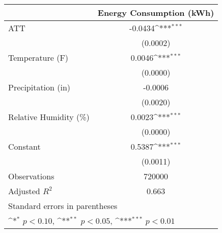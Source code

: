 {
\def\sym#1{\ifmmode^{#1}\else\(^{#1}\)\fi}
\begin{tabular}{l*{1}{c}}
\hline\hline
                    &\multicolumn{1}{c}{Energy Consumption (kWh)}\\
\hline
ATT                 &     -0.0434\sym{***}\\
                    &    (0.0002)         \\
[1em]
Temperature (F)     &      0.0046\sym{***}\\
                    &    (0.0000)         \\
[1em]
Precipitation (in)  &     -0.0006         \\
                    &    (0.0020)         \\
[1em]
Relative Humidity (\%)&      0.0023\sym{***}\\
                    &    (0.0000)         \\
[1em]
Constant            &      0.5387\sym{***}\\
                    &    (0.0011)         \\
\hline
Observations        &      720000         \\
Adjusted \(R^{2}\)  &       0.663         \\
\hline\hline
\multicolumn{2}{l}{\footnotesize Standard errors in parentheses}\\
\multicolumn{2}{l}{\footnotesize \sym{*} \(p<0.10\), \sym{**} \(p<0.05\), \sym{***} \(p<0.01\)}\\
\end{tabular}
}
